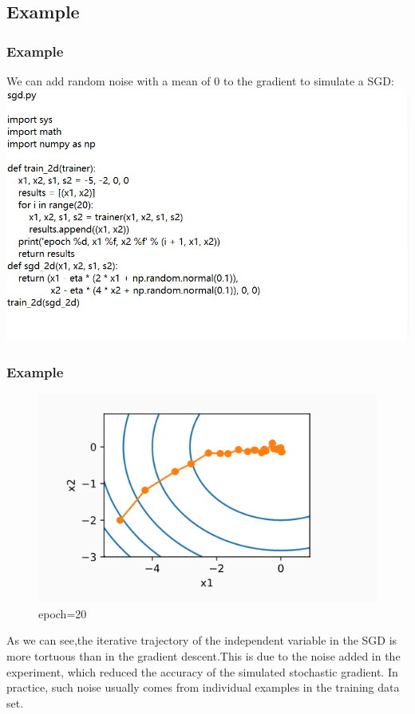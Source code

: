 \documentclass[cjk]{beamer}
\begin{document}
\subsection{Example}

\begin{frame}
\frametitle{Example}
We can add random noise with a mean of 0 to the gradient to simulate a SGD:
\includegraphics[width= \textwidth]{sgd1.png}
\end{frame}

\begin{frame}
\frametitle{Example}
\begin{figure}
\begin{minipage}[t]{\linewidth}
\centering
\includegraphics[width= .6\textwidth]{SGD.png}
\caption{epoch=20}
\end{minipage}
\end{figure}
As we can see,the iterative trajectory of the independent variable in the SGD is more tortuous than in the gradient descent.This is due to the noise added in the experiment, which reduced the accuracy of the simulated stochastic gradient. In practice, such noise usually comes from individual examples in the training data set.
\end{frame}
\end{document}
